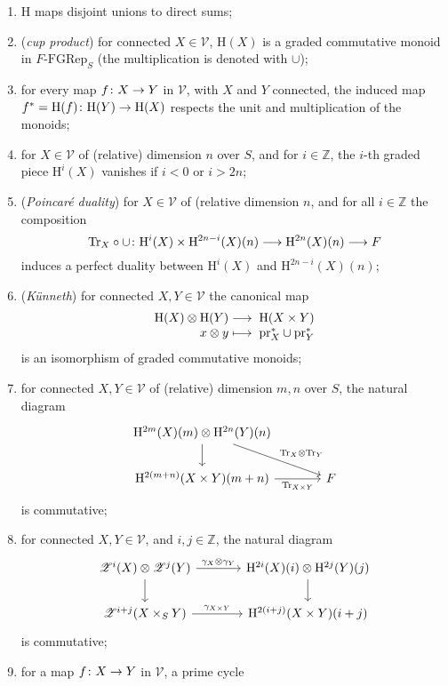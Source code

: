 \documentclass[a4paper,10pt]{article}
\def\basepieces{\mathscr{V}}
\newcommand{\fgrep}[2]{#1\textrm{-}\mathrm{FGRep}_{#2}}
\def\coh{\mathrm{H}}
\def\tensor{\otimes}
\def\pr{\mathrm{pr}}
\def\cyc{\mathscr{Z}}
\def\Tr{\mathrm{Tr}}
\begin{document}
\begin{enumerate}[label=(C\arabic*)] %
	\item $\coh$ maps disjoint unions to direct sums;
	\item (\emph{cup product}) for connected $X \in \basepieces$, $\coh(X)$
		is a graded commutative monoid in $\fgrep{F}{S}$ (the
		multiplication is denoted with $\cup$);
	\item for every map $\map[f]{X}{Y}$ in $\basepieces$, with $X$ and $Y$
		connected, the induced map $f^{*} =
		\map[\coh(f)]{\coh(Y)}{\coh(X)}$ respects the unit and
		multiplication of the monoids;
	\item for $X \in \basepieces$ of (relative) dimension $n$ over $S$, and
		for $i \in \mathbb{Z}$, the $i$-th graded piece $\coh^{i}(X)$
		vanishes if $i < 0$ or $i > 2n$;
	\item (\emph{Poincar\'{e} duality}) for $X \in \basepieces$ of
		(relative dimension $n$, and for all $i \in \mathbb{Z}$ the
		composition
		\[
			\map[\Tr_{X} \circ \cup]%
			{\coh^{i}(X) \times \coh^{2n-i}(X)(n)}%
			{\coh^{2n}(X)(n) \longrightarrow F}
		\]
		induces a perfect duality between $\coh^{i}(X)$ and
		$\coh^{2n-i}(X)(n)$;
	\item (\emph{K\"{u}nneth}) for connected $X,Y \in \basepieces$ the
		canonical map
		\[
			\map{\coh(X) \tensor \coh(Y)}{\coh(X \times Y)}%
			[x \tensor y][\pr_{X}^{*} \cup \pr_{Y}^{*}]
		\]
		is an isomorphism of graded commutative monoids;
	\item for connected $X,Y \in \basepieces$ of (relative) dimension $m,n$
		over $S$, the natural diagram
		\[ \begin{tikzcd}[column sep=large] %
			\coh^{2m}(X)(m) \tensor \coh^{2n}(Y)(n)
			\drar{\Tr_{X} \tensor \Tr_{Y}}
			\dar{} & \\
			\coh^{2(m+n)}(X \times Y)(m+n)
			\rar[swap]{\Tr_{X \times Y}} &
			F
		\end{tikzcd} \] %
		is commutative;
	\item for connected $X,Y \in \basepieces$, and $i,j \in \mathbb{Z}$,
		the natural diagram
		\[ \begin{tikzcd}[column sep=large] %
			\cyc^{i}(X) \tensor \cyc^{j}(Y) \dar
			\rar{\gamma_{X} \tensor \gamma_{Y}} &
			\coh^{2i}(X)(i) \tensor \coh^{2j}(Y)(j) \dar \\
			\cyc^{i+j}(X \times_{S} Y) \rar{\gamma_{X \times Y}} &
			\coh^{2(i+j)}(X \times Y)(i+j)
		\end{tikzcd} \] %
		is commutative;
	\item for a map $\map[f]{X}{Y}$ in $\basepieces$, a prime cycle

\end{enumerate}
\end{document}
